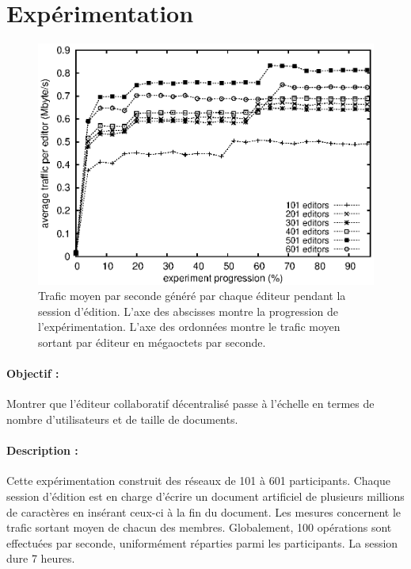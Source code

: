 
\section{Expérimentation}
\label{editor:sec:experimentation}


\begin{figure}
  \begin{center}
    \includegraphics[scale=0.8\textwidth]{img/editor/communication.eps}
    \caption{\label{editor:img:communication} Trafic moyen par seconde généré
      par chaque éditeur pendant la session d'édition. L'axe des abscisses
      montre la progression de l'expérimentation. L'axe des ordonnées montre le
      trafic moyen sortant par éditeur en mégaoctets par seconde.}
  \end{center}
\end{figure}

\paragraph{Objectif :} Montrer que l'éditeur collaboratif décentralisé \CRATE
passe à l'échelle en termes de nombre d'utilisateurs et de taille de
documents.

\paragraph{Description :} Cette expérimentation construit des réseaux de 101 à
601 participants. Chaque session d'édition est en charge d'écrire un document
artificiel de plusieurs millions de caractères en insérant ceux-ci à la fin du
document. Les mesures concernent le trafic sortant moyen de chacun des
membres. Globalement, 100 opérations sont effectuées par seconde, uniformément
réparties parmi les participants. La session dure 7 heures.

